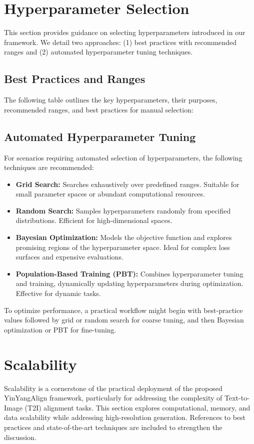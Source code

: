 \section{Hyperparameter Selection}
This section provides guidance on selecting hyperparameters introduced in our framework. We detail two approaches: (1) best practices with recommended ranges and (2) automated hyperparameter tuning techniques.

\subsection{Best Practices and Ranges}
The following table outlines the key hyperparameters, their purposes, recommended ranges, and best practices for manual selection:





\subsection{Automated Hyperparameter Tuning}
For scenarios requiring automated selection of hyperparameters, the following techniques are recommended:
\begin{itemize}
    \item \textbf{Grid Search:} Searches exhaustively over predefined ranges. Suitable for small parameter spaces or abundant computational resources.
    \item \textbf{Random Search:} Samples hyperparameters randomly from specified distributions. Efficient for high-dimensional spaces.
    \item \textbf{Bayesian Optimization:} Models the objective function and explores promising regions of the hyperparameter space. Ideal for complex loss surfaces and expensive evaluations.
    \item \textbf{Population-Based Training (PBT):} Combines hyperparameter tuning and training, dynamically updating hyperparameters during optimization. Effective for dynamic tasks.
\end{itemize}

To optimize performance, a practical workflow might begin with best-practice values followed by grid or random search for coarse tuning, and then Bayesian optimization or PBT for fine-tuning.


\section{Scalability}
Scalability is a cornerstone of the practical deployment of the proposed YinYangAlign framework, particularly for addressing the complexity of Text-to-Image (T2I) alignment tasks. This section explores computational, memory, and data scalability while addressing high-resolution generation. References to best practices and state-of-the-art techniques are included to strengthen the discussion.

